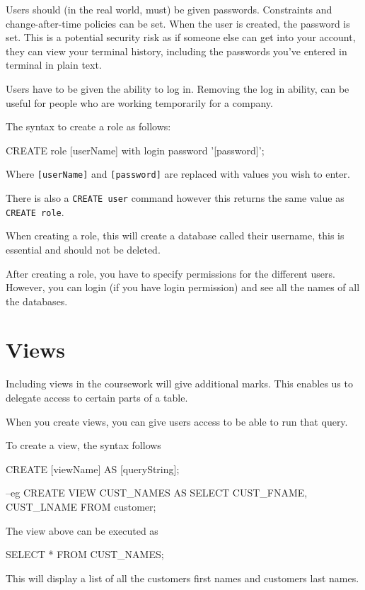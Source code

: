 Users should (in the real world, must) be given passwords. Constraints and change-after-time policies can be set. When the user is created, the password is set. This is a potential security risk as if someone else can get into your account, they can view your terminal history, including the passwords you've entered in terminal in plain text.

Users have to be given the ability to log in. Removing the log in ability, can be useful for people who are working temporarily for a company.

The syntax to create a role as follows:
\begin{sql}
CREATE role [userName] with login password '[password]';
\end{sql}
Where \verb|[userName]| and \verb|[password]| are replaced with values you wish to enter.

There is also a \verb|CREATE user| command however this returns the same value as \verb|CREATE role|. 

When creating a role, this will create a database called their username, this is essential and should not be deleted.

After creating a role, you have to specify permissions for the different users. However, you can login (if you have login permission) and see all the names of all the databases.

\section*{Views}
Including views in the coursework will give additional marks.
This enables us to delegate access to certain parts of a table. 

When you create views, you can give users access to be able to run that query.

To create a view, the syntax follows
\begin{sql}
CREATE [viewName] AS [queryString];

--eg
CREATE VIEW CUST_NAMES AS SELECT CUST_FNAME, CUST_LNAME FROM customer;
\end{sql}
The view above can be executed as
\begin{sql}
SELECT * FROM CUST_NAMES;
\end{sql}
This will display a list of all the customers first names and customers last names.

